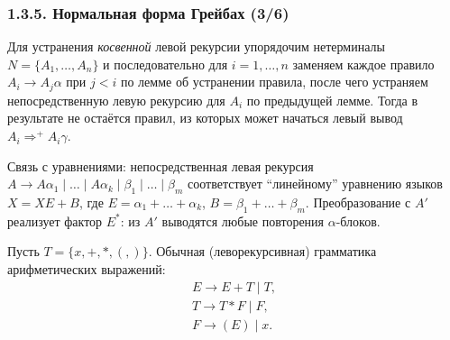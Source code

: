 \begin{frame}
\frametitle{1.3.5. Нормальная форма Грейбах (3/6)}
\begin{remark}
Для устранения \emph{косвенной} левой рекурсии упорядочим нетерминалы
$N=\{A_1,\dots,A_n\}$ и последовательно для $i=1,\dots,n$ заменяем
каждое правило $A_i\to A_j\alpha$ при $j<i$ по лемме об устранении правила,
после чего устраняем непосредственную левую рекурсию для $A_i$
по предыдущей лемме. Тогда в результате не остаётся правил,
из которых может начаться левый вывод $A_i\Rightarrow^+ A_i\gamma$.
\end{remark}
\begin{digress}
Связь с уравнениями: непосредственная левая рекурсия
$A\to A\alpha_1\mid\dots\mid A\alpha_k\mid \beta_1\mid\dots\mid \beta_m$
соответствует ``линейному'' уравнению языков $X=XE+B$,
где $E=\alpha_1+\dots+\alpha_k$, $B=\beta_1+\dots+\beta_m$.
Преобразование с $A'$ реализует фактор $E^*$: из $A'$ выводятся любые повторения $\alpha$-блоков.
\end{digress}

\begin{example}
Пусть $T=\{x,+,\ast,(,)\}$.
Обычная (леворекурсивная) грамматика арифметических выражений:
\[
\begin{array}{l}
E\to E+T \mid T,\\
T\to T\ast F \mid F,\\
F\to (E)\mid x.
\end{array}
\]
\end{example}
\end{frame}


